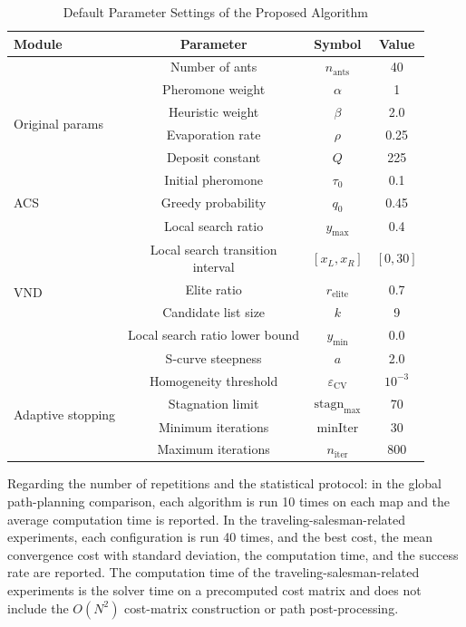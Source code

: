 \documentclass[lettersize,journal]{IEEEtran}
\begin{document}
\begin{table}[!ht]
\caption{Default Parameter Settings of the Proposed Algorithm}
\label{tab:params}
\centering
\scriptsize
\begin{tabular}{lccc}
\toprule
Module & Parameter & Symbol & Value \\
\midrule
\multirow{6}{*}{Original params}
& Number of ants & $n_{\mathrm{ants}}$ & 40 \\
& Pheromone weight & $\alpha$ & 1 \\
& Heuristic weight & $\beta$ & 2.0 \\
& Evaporation rate & $\rho$ & 0.25 \\
& Deposit constant & $Q$ & 225 \\
& Initial pheromone & $\tau_0$ & 0.1 \\
\midrule
\multirow{1}{*}{ACS}
& Greedy probability & $q_0$ & 0.45 \\
\midrule
\multirow{6}{*}{VND}
& Local search ratio & $y_{\max}$ & 0.4 \\
& \makecell{Local search transition\\interval} & $[x_L, x_R]$ & $[0, 30]$ \\
& Elite ratio & $r_{\mathrm{elite}}$ & 0.7 \\
& Candidate list size & $k$ & 9 \\
& Local search ratio lower bound & $y_{\min}$ & 0.0 \\
& S-curve steepness & $a$ & 2.0 \\
\midrule
\multirow{4}{*}{Adaptive stopping}
& Homogeneity threshold & $\varepsilon_{\mathrm{CV}}$ & $10^{-3}$ \\
& Stagnation limit & $\mathrm{stagn}_{\max}$ & 70 \\
& Minimum iterations & $\mathrm{minIter}$ & 30 \\
& Maximum iterations & $n_{\mathrm{iter}}$ & 800 \\
\bottomrule
\end{tabular}
\end{table}

Regarding the number of repetitions and the statistical protocol: in the global path-planning comparison, each algorithm is run 10 times on each map and the average computation time is reported. In the traveling-salesman-related experiments, each configuration is run 40 times, and the best cost, the mean convergence cost with standard deviation, the computation time, and the success rate are reported. The computation time of the traveling-salesman-related experiments is the solver time on a precomputed cost matrix and does not include the $O(N^2)$ cost-matrix construction or path post-processing.
\end{document}
